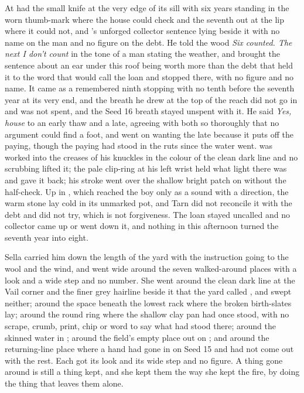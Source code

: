 At   had the small knife at the very edge of its sill with six years standing in the worn thumb-mark where the house could check and the seventh out at the lip where it could not, and 's unforged collector sentence lying beside it with no name on the man and no figure on the debt. He told the wood \emph{Six counted. The next I don't count} in the tone of a man stating the weather, and brought the sentence about an ear under this roof being worth more than the debt that held it to the word that would call the loan and stopped there, with no figure and no name. It came as a remembered ninth stopping with no tenth before the seventh year at its very end, and the breath he drew at the top of the reach did not go in and was not spent, and the Seed 16 breath stayed unspent with it. He said \emph{Yes, house} to an early thaw and a late, agreeing with both so thoroughly that no argument could find a foot, and went on wanting the late because it puts off the paying, though the paying had stood in the ruts since the water went.  was worked into the creases of his knuckles in the colour of the clean dark line and no scrubbing lifted it; the pale clip-ring at his left wrist held what light there was and gave it back; his stroke went over the shallow bright patch on  without the half-check. Up in , which reached the boy only as a sound with a direction, the warm stone lay cold in its unmarked pot, and Tarn did not reconcile it with the debt and did not try, which is not forgiveness. The loan stayed uncalled and no collector came up  or went down it, and nothing in this afternoon turned the seventh year into eight.

Sella carried him down the length of the yard with the instruction going to the wool and the wind, and went wide around the seven walked-around places with a look and a wide step and no number. She went around the clean dark line at the Vail corner and the finer grey hairline beside it that the yard called , and swept neither; around the space beneath the lowest rack where the broken birth-slates lay; around the round ring where the shallow clay pan had once stood, with no scrape, crumb, print, chip or word to say what had stood there; around the skinned water in ; around the field's empty place out on ; and around the returning-line place where a hand had gone in on Seed 15 and had not come out with the rest. Each got its look and its wide step and no figure. A thing gone around is still a thing kept, and she kept them the way she kept the fire, by doing the thing that leaves them alone.

